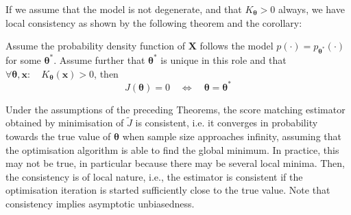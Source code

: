 If we assume that the model is not degenerate, and that $K_{\bm{\theta}} > 0$ always, we have local consistency as shown by the following theorem and the corollary:

\begin{theorem}
Assume the probability density function of $\bm{X}$ follows the model $p(\cdot) = p_{\bm{\theta}^\ast}(\cdot)$ for some $\bm{\theta}^\ast$.
Assume further that $\bm{\theta}^\ast$ is unique in this role and that $\forall \bm{\theta}, \bm{x}: \quad K_{\bm{\theta}}(\bm{x}) > 0$, then
\[
	J(\bm{\theta}) = 0 \quad \Leftrightarrow \quad \bm{\theta} = \bm{\theta}^\ast
\]
\end{theorem}

Under the assumptions of the preceding Theorems, the score matching estimator obtained by minimisation of $\tilde{J}$ is consistent, 
i.e. it converges in probability towards the true value of $\bm{\theta}$ when sample size approaches infinity, 
assuming that the optimisation algorithm is able to find the global minimum.
In practice, this may not be true, in particular because there may be several local minima. 
Then, the consistency is of local nature, i.e., the estimator is consistent if the optimisation iteration is started sufficiently close to the true value. 
Note that consistency implies asymptotic unbiasedness.






